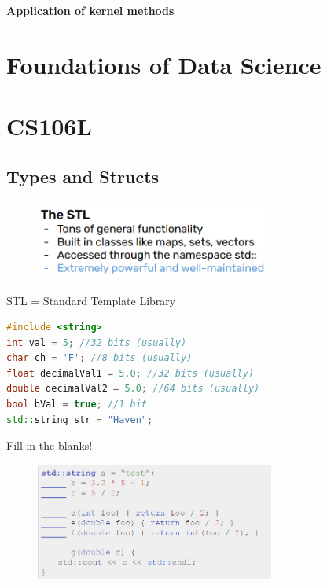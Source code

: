 \documentclass[12pt, a4paper, oneside]{ctexbook}
\begin{document}
\newpage

\textbf{Application of kernel methods}

\hspace*{\fill}


\chapter{Foundations of Data Science}



















\chapter{CS106L}

\section{Types and Structs}

  \begin{figure}[h]
		\centering 
		\includegraphics[width=0.7\textwidth]{images1.png} 
	\end{figure}

STL = Standard Template Library

\begin{lstlisting}[language=c++]
#include <string>
int val = 5; //32 bits (usually)
char ch = 'F'; //8 bits (usually)
float decimalVal1 = 5.0; //32 bits (usually)
double decimalVal2 = 5.0; //64 bits (usually)
bool bVal = true; //1 bit
std::string str = "Haven";
\end{lstlisting}

Fill in the blanks!

  \begin{figure}[h]
		\centering 
		\includegraphics[width=0.7\textwidth]{images2.png} 
	\end{figure}
\end{document}
